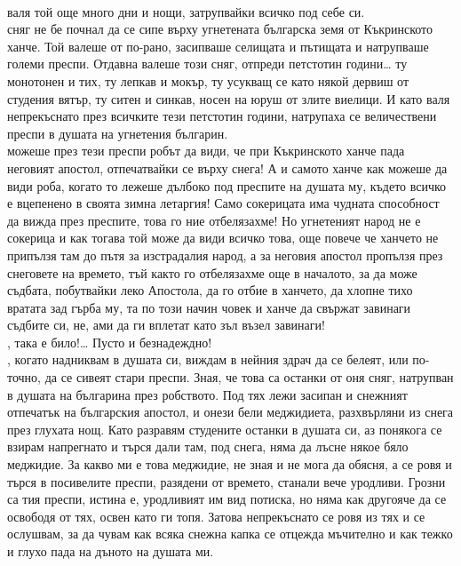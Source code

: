 \documentclass[12pt,a4paper]{article}
\begin{document}
\\
 валя той още много дни и нощи, затрупвайки всичко под себе си.
\\
 сняг не бе почнал да се сипе върху угнетената българска земя от Къкринското ханче. Той валеше от по-рано, засипваше селищата и пътищата и натрупваше големи преспи. Отдавна валеше този сняг, отпреди петстотин години… ту монотонен и тих, ту лепкав и мокър, ту усукващ се като някой дервиш от студения вятър, ту ситен и синкав, носен на юруш от злите виелици. И като валя непрекъснато през всичките тези петстотин години, натрупаха се величествени преспи в душата на угнетения българин.
\\
 можеше през тези преспи робът да види, че при Къкринското ханче пада неговият апостол, отпечатвайки се върху снега! А и самото ханче как можеше да види роба, когато то лежеше дълбоко под преспите на душата му, където всичко е вцепенено в своята зимна летаргия! Само сокерицата има чудната способност да вижда през преспите, това го ние отбелязахме! Но угнетеният народ не е сокерица и как тогава той може да види всичко това, още повече че ханчето не припълзя там до пътя за изстрадалия народ, а за неговия апостол пропълзя през снеговете на времето, тъй както го отбелязахме още в началото, за да може съдбата, побутвайки леко Апостола, да го отбие в ханчето, да хлопне тихо вратата зад гърба му, та по този начин човек и ханче да свържат завинаги съдбите си, не, ами да ги вплетат като зъл възел завинаги!
\\
, така е било!… Пусто и безнадеждно!
\\
, когато надниквам в душата си, виждам в нейния здрач да се белеят, или по-точно, да се сивеят стари преспи. Зная, че това са останки от оня сняг, натрупван в душата на българина през робството. Под тях лежи засипан и снежният отпечатък на българския апостол, и онези бели меджидиета, разхвърляни из снега през глухата нощ. Като разравям студените останки в душата си, аз понякога се взирам напрегнато и търся дали там, под снега, няма да лъсне някое бяло меджидие. За какво ми е това меджидие, не зная и не мога да обясня, а се ровя и търся в посивелите преспи, разядени от времето, станали вече уродливи. Грозни са тия преспи, истина е, уродливият им вид потиска, но няма как другояче да се освободя от тях, освен като ги топя. Затова непрекъснато се ровя из тях и се ослушвам, за да чувам как всяка снежна капка се отцежда мъчително и как тежко и глухо пада на дъното на душата ми.
\end{document}
